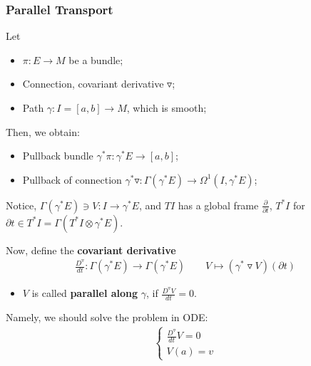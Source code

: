 \documentclass[Total.tex]{subfiles}
\begin{document}
			\subsubsection{Parallel Transport}
				\begin{Def}
					Let
					\begin{itemize}
						\item $\pi:E\rightarrow M$ be a bundle;
						\item Connection, covariant derivative $\triangledown$;
						\item Path $\gamma:I=[a,b]\rightarrow M$, which is smooth;
					\end{itemize}
					
					Then, we obtain:
					\begin{itemize}
						\item Pullback bundle $\gamma^*\pi:\gamma^*E\rightarrow [a,b]$;
						\item Pullback of connection $\gamma^*\triangledown:\Gamma(\gamma^*E)\rightarrow \Omega^1(I,\gamma^*E)$;
					\end{itemize}
					
					Notice, $\Gamma(\gamma^*E)\ni V:I\rightarrow \gamma^*E$, and $TI$ has a global frame $\frac{\partial}{\partial t}$, $T^*I$ for $\partial t\in T^*I=\Gamma(T^*I\otimes \gamma^*E)$.
					
					Now, define the \textbf{covariant derivative}
					\begin{gather*}
						\frac{D^\triangledown}{dt}:\Gamma(\gamma^*E)\rightarrow \Gamma(\gamma^*E)\qquad V\mapsto (\gamma^*\triangledown V)(\partial t)
					\end{gather*}

					\begin{itemize}
						\item $V$ is called \textbf{parallel along} $\gamma$, if $\frac{D^\triangledown V}{dt}=0$.
					\end{itemize}
				\end{Def}
				
				Namely, we should solve the problem in ODE:
				\begin{gather*}
					\begin{cases}
						\frac{D^\triangledown}{dt}V=0\\
						V(a)=v
					\end{cases}
				\end{gather*}
				
\end{document}
